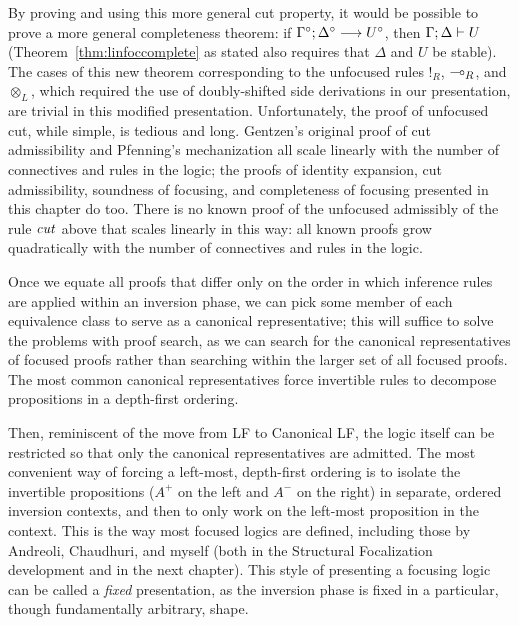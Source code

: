By proving and using this more general cut property, it would be
possible to prove a more general completeness theorem: if 
${\Gamma^\circ};{\Delta^\circ} \longrightarrow {U^\circ} \mathstrut$, then ${\Gamma};{\Delta} \vdash {U} \mathstrut$
(Theorem~\ref{thm:linfoccomplete} as stated also requires that $\Delta$
and $U$ be stable). The cases of this new 
theorem corresponding to the unfocused rules ${!}_R$,
${\multimap}_R$, and ${\otimes}_L$, which required the use of
doubly-shifted side derivations in our presentation, are trivial in this
modified presentation.  Unfortunately, the proof of unfocused cut,
while simple, is tedious and long. Gentzen's original proof of cut
admissibility \cite{gentzen35untersuchungen} and Pfenning's mechanization
\cite{pfenning00structural} all scale linearly with the number of
connectives and rules in the logic; the proofs of identity expansion, cut
admissibility, soundness of focusing, and completeness of focusing
presented in this chapter do too. There is no known proof of the
unfocused admissibly of the rule ${\it cut}$ above that scales
linearly in this way: all known proofs grow quadratically with the
number of connectives and rules in the logic.

%
Once we equate all proofs that differ only on the order
in which inference rules are applied within an inversion phase, 
we can pick some member of
each equivalence class
to serve as a canonical representative; this will suffice
to solve the problems with proof search, as we can search for 
the canonical representatives of focused proofs rather than searching
within the larger set of all focused proofs. The most common canonical
representatives force invertible rules to decompose propositions 
in a depth-first ordering. 

Then, reminiscent of the move from LF to Canonical LF, the logic
itself can be restricted so that only the canonical representatives
are admitted. The most convenient way of forcing a left-most,
depth-first ordering is to isolate the invertible propositions ($A^+$
on the left and $A^-$ on the right) in separate, ordered inversion
contexts, and then to only work on the left-most proposition in the
context. This is the way most focused logics are defined, including
those by Andreoli, Chaudhuri, and myself (both in the Structural
Focalization development and in the next chapter). This style of 
presenting a focusing logic can be called a {\it fixed} presentation,
as the inversion phase is fixed in a particular, though
fundamentally arbitrary, shape. 

